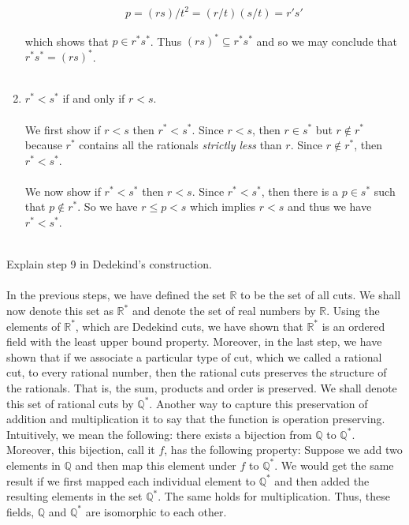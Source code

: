 \documentclass[12pt]{article}
\begin{document}
\begin{enumerate}
\begin{align*}
p=(rs)/t^{2}=(r/t)(s/t)=r's'
\end{align*}  

which shows that $p \in r^{*}s^{*}$. Thus $(rs)^{*} \subseteq r^{*}s^{*}$ and so we may conclude that $r^{*}s^{*} = (rs)^{*}$. \\ \\  

\item $r^{*}<s^{*}$ if and only if $r<s$. \\ \\

We first show if $r<s$ then $r^{*}<s^{*}$. Since $r<s$, then $r \in s^{*}$ but $r \notin r^{*}$ because $r^{*}$ contains all the rationals \textsl{strictly less} than $r$. Since $r \notin r^{*}$, then $r^{*}<s^{*}$. \\ \\

We now show if $r^{*}<s^{*}$ then $r<s$. Since $r^{*}<s^{*}$, then there is a $p \in s^{*}$ such that $p \notin r^{*}$. So we have $r \leq p < s$ which implies $r<s$ and thus we have $r^{*}<s^{*}$. \\ \\
\end{enumerate}



\problem Explain step 9 in Dedekind's construction. \\ \\

In the previous steps, we have defined the set $\mathbb{R}$ to be the set of all cuts. We shall now denote this set as $\mathbb{R}^{*}$ and denote the set of real numbers by $\mathbb{R}$. Using the elements of $\mathbb{R}^{*}$, which are Dedekind cuts, we have shown that $\mathbb{R}^{*}$ is an ordered field with the least upper bound property. Moreover, in the last step, we have shown that if we associate a particular type of cut, which we called a rational cut, to every rational number, then the rational cuts preserves the structure of the rationals. That is, the sum, products and order is preserved. We shall denote this set of rational cuts by $\mathbb{Q}^{*}$. Another way to capture this preservation of addition and multiplication it to say that the function is operation preserving. Intuitively, we mean the following: there exists a bijection from $\mathbb{Q}$ to $\mathbb{Q}^{*}$. Moreover, this bijection, call it $f$, has the following property: Suppose we add two elements in $\mathbb{Q}$ and then map this element under $f$ to $\mathbb{Q}^{*}$. We would get the same result if we first mapped each individual element to $\mathbb{Q}^{*}$ and then added the resulting elements in the set $\mathbb{Q}^{*}$. The same holds for multiplication. Thus, these fields, $\mathbb{Q}$ and $\mathbb{Q}^{*}$ are isomorphic to each other. \\ \\
\end{document}
